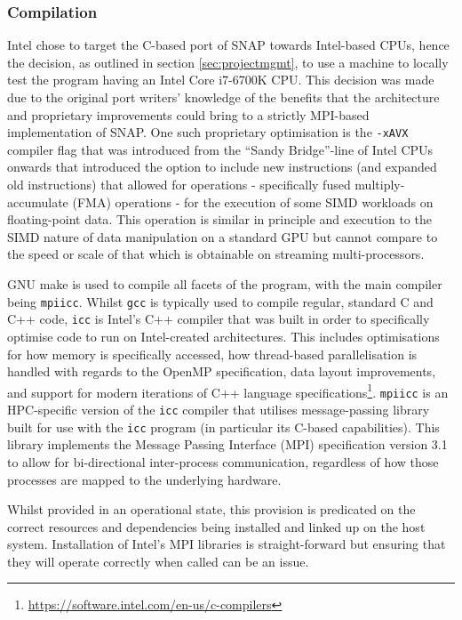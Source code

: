 \documentclass[conference]{IEEEtran}
\begin{document}
\subsubsection{Compilation}
\label{subsubsec:inv_compilation}

Intel chose to target the C-based port of SNAP towards Intel-based CPUs, hence the decision, as outlined in section \ref{sec:projectmgmt}, to use a machine to locally test the program having an Intel Core i7-6700K CPU. This decision was made due to the original port writers' knowledge of the benefits that the architecture and proprietary improvements could bring to a strictly MPI-based implementation of SNAP. One such proprietary optimisation is the \texttt{-xAVX} compiler flag that was introduced from the ``Sandy Bridge''-line of Intel CPUs onwards that introduced the option to include new instructions (and expanded old instructions) that allowed for operations - specifically fused multiply-accumulate (FMA) operations - for the execution of some SIMD workloads on floating-point data\cite{KanterIntel}. This operation is similar in principle and execution to the SIMD nature of data manipulation on a standard GPU but cannot compare to the speed or scale of that which is obtainable on streaming multi-processors.

GNU make is used to compile all facets of the program, with the main compiler being \texttt{mpiicc}. Whilst \texttt{gcc} is typically used to compile regular, standard C and C++ code, \texttt{icc} is Intel's C++ compiler that was built in order to specifically optimise code to run on Intel-created architectures. This includes optimisations for how memory is specifically accessed, how thread-based parallelisation is handled with regards to the OpenMP specification, data layout improvements, and support for modern iterations of C++ language specifications\footnote{\url{https://software.intel.com/en-us/c-compilers}}. \texttt{mpiicc} is an HPC-specific version of the \texttt{icc} compiler that utilises message-passing library built for use with the \texttt{icc} program (in particular its C-based capabilities). This library implements the Message Passing Interface (MPI) specification version 3.1\cite{intel-mpi-ref} to allow for bi-directional inter-process communication, regardless of how those processes are mapped to the underlying hardware.

Whilst provided in an operational state, this provision is predicated on the correct resources and dependencies being installed and linked up on the host system. Installation of Intel's MPI libraries is straight-forward but ensuring that they will operate correctly when called can be an issue.
\end{document}

